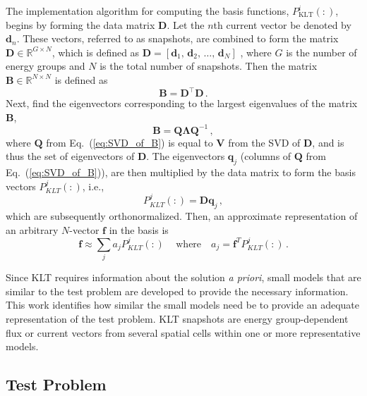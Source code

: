 \documentclass{anstrans}
\newcommand{\EQ}[1]{Eq.~(\ref{#1})}               %
\begin{document}
The implementation algorithm for computing the basis
functions, $P^i_{\text{KLT}}(:)$, begins by forming the data matrix
$\mathbf{D}$.  Let the $n$th current vector be denoted by
$\mathbf{d}_n$.  These
vectors, referred to as snapshots, are combined to form the
matrix $\mathbf{D} \in \mathbb{R}^{G\times N}$, which is defined as $\mathbf{D}
= [\mathbf{d}_1,\, \mathbf{d}_2,\, \ldots, \, \mathbf{d}_N]$
\cite{Meyer2002}, where $G$ is the number of energy groups and $N$ is the total
number of snapshots. Then the matrix
$\mathbf{B} \in \mathbb{R}^{N\times N}$ is defined as
\begin{equation}
    \mathbf{B} = \mathbf{D}^{\intercal}\mathbf{D} \, .
    \label{eq:KLT}
\end{equation}
Next, find the eigenvectors corresponding to the largest eigenvalues of the
matrix
$\mathbf{B}$,
\begin{equation}
    \label{eq:SVD_of_B}
    \mathbf{B} = \mathbf{Q}\mathbf{\Lambda}\mathbf{Q}^{-1}\, ,
\end{equation}
where $\mathbf{Q}$ from \EQ{eq:SVD_of_B} is equal
to $\mathbf{V}$
from the SVD of $\mathbf{D}$, and is thus the set of
eigenvectors of
$\mathbf{D}$. The eigenvectors $\mathbf{q}_j$ (columns of $\mathbf{Q}$ from
\EQ{eq:SVD_of_B}), are
then multiplied by the data matrix to form the basis vectors $P^j_{KLT}(:)$,
i.e.,
\begin{equation}
    P^j_{KLT}(:) = \mathbf{D}\mathbf{q}_j \, ,
\end{equation}
which are subsequently orthonormalized.  Then, an approximate representation of
an arbitrary $N$-vector $\mathbf{f}$ in the basis is
\begin{equation}
    \mathbf{f} \approx \sum_j a_j P^j_{KLT}(:) \, \quad \text{where} \quad a_j
    =
    \mathbf{f}^T P^j_{KLT}(:) \, .
    \label{eq:KLT_def}
\end{equation}

Since KLT requires information about the solution {\it a priori}, small models
that are similar to the test problem are developed to provide the necessary
information.  This work identifies how similar the small models need be to
provide an adequate representation of the test problem. KLT snapshots are
energy group-dependent flux or current vectors from several spatial cells within
one or more representative models.

\subsection{Test Problem}
\end{document}
